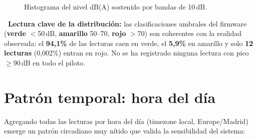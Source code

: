 \documentclass[11pt,a4paper,openany]{report}
\begin{document}
\begin{figure}[H]
\centering
{}
\caption{Histograma del nivel dB(A) sostenido por bandas de 10\,dB.}
\end{figure}

\begin{KeyFinding}
\textbf{\faLightbulb\ Lectura clave de la distribuci\'on:} las clasificaciones umbrales del firmware (\textbf{verde} $<$50\,dB, \textbf{amarillo} 50--70, \textbf{rojo} $>$70) son coherentes con la realidad observada: el \textbf{94,1\%} de las lecturas caen en verde, el \textbf{5,9\%} en amarillo y solo \textbf{12 lecturas} (0,002\%) entran en rojo. No se ha registrado ninguna lectura con pico $\geq 90$\,dB en todo el piloto.
\end{KeyFinding}

\section{Patr\'on temporal: hora del d\'ia}

Agregando todas las lecturas por hora del d\'ia (timezone local, Europe/Madrid) emerge un patr\'on circadiano muy n\'itido que valida la sensibilidad del sistema:
\end{document}
